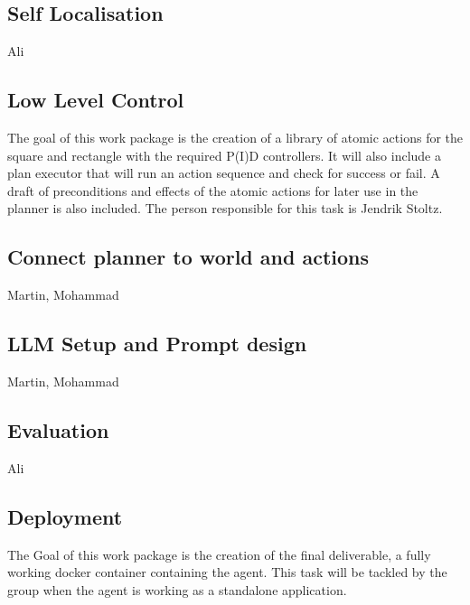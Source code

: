 \documentclass{article}
\begin{document}
\subsection{Self Localisation}
Ali

\subsection{Low Level Control}
The goal of this work package is the creation of a library of atomic actions for the square and rectangle with the required P(I)D controllers. It will also include a plan executor that will run an action sequence and check for success or fail.
A draft of preconditions and effects of the atomic actions for later use in the planner is also included. The person responsible for this task is Jendrik Stoltz.

\subsection{Connect planner to world and actions}
Martin, Mohammad

\subsection{LLM Setup and Prompt design}
Martin, Mohammad

\subsection{Evaluation}
Ali

\subsection{Deployment}
The Goal of this work package is the creation of the final deliverable, a fully working docker container containing the agent. 
This task will be tackled by the group when the agent is working as a standalone application.
\end{document}
